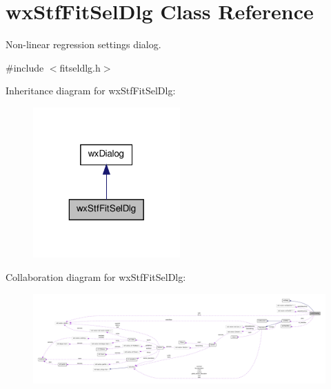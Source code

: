 \hypertarget{classwxStfFitSelDlg}{
\section{wxStfFitSelDlg Class Reference}
\label{classwxStfFitSelDlg}
}


Non-\/linear regression settings dialog.  




{\ttfamily \#include $<$fitseldlg.h$>$}



Inheritance diagram for wxStfFitSelDlg:
\nopagebreak
\begin{figure}[H]
\begin{center}
\leavevmode
\includegraphics[width=160pt]{classwxStfFitSelDlg__inherit__graph}
\end{center}
\end{figure}


Collaboration diagram for wxStfFitSelDlg:
\nopagebreak
\begin{figure}[H]
\begin{center}
\leavevmode
\includegraphics[width=400pt]{classwxStfFitSelDlg__coll__graph}
\end{center}
\end{figure}
